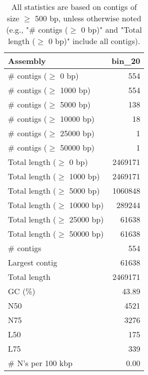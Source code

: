 \documentclass[12pt,a4paper]{article}
\begin{document}
\begin{table}[ht]
\begin{center}
\caption{All statistics are based on contigs of size $\geq$ 500 bp, unless otherwise noted (e.g., "\# contigs ($\geq$ 0 bp)" and "Total length ($\geq$ 0 bp)" include all contigs).}
\begin{tabular}{|l*{1}{|r}|}
\hline
Assembly & bin\_20 \\ \hline
\# contigs ($\geq$ 0 bp) & 554 \\ \hline
\# contigs ($\geq$ 1000 bp) & 554 \\ \hline
\# contigs ($\geq$ 5000 bp) & 138 \\ \hline
\# contigs ($\geq$ 10000 bp) & 18 \\ \hline
\# contigs ($\geq$ 25000 bp) & 1 \\ \hline
\# contigs ($\geq$ 50000 bp) & 1 \\ \hline
Total length ($\geq$ 0 bp) & 2469171 \\ \hline
Total length ($\geq$ 1000 bp) & 2469171 \\ \hline
Total length ($\geq$ 5000 bp) & 1060848 \\ \hline
Total length ($\geq$ 10000 bp) & 289244 \\ \hline
Total length ($\geq$ 25000 bp) & 61638 \\ \hline
Total length ($\geq$ 50000 bp) & 61638 \\ \hline
\# contigs & 554 \\ \hline
Largest contig & 61638 \\ \hline
Total length & 2469171 \\ \hline
GC (\%) & 43.89 \\ \hline
N50 & 4521 \\ \hline
N75 & 3276 \\ \hline
L50 & 175 \\ \hline
L75 & 339 \\ \hline
\# N's per 100 kbp & 0.00 \\ \hline
\end{tabular}
\end{center}
\end{table}
\end{document}
